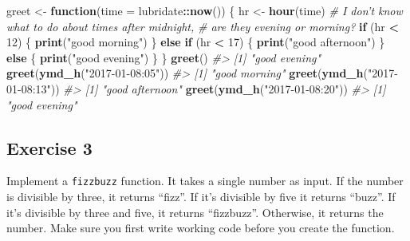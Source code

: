 \documentclass[]{book}
\newenvironment{Shaded}{\begin{snugshade}}{\end{snugshade}}
\newcommand{\CommentTok}[1]{\textcolor[rgb]{0.56,0.35,0.01}{\textit{#1}}}
\newcommand{\ControlFlowTok}[1]{\textcolor[rgb]{0.13,0.29,0.53}{\textbf{#1}}}
\newcommand{\DataTypeTok}[1]{\textcolor[rgb]{0.13,0.29,0.53}{#1}}
\newcommand{\DecValTok}[1]{\textcolor[rgb]{0.00,0.00,0.81}{#1}}
\newcommand{\KeywordTok}[1]{\textcolor[rgb]{0.13,0.29,0.53}{\textbf{#1}}}
\newcommand{\NormalTok}[1]{#1}
\newcommand{\OperatorTok}[1]{\textcolor[rgb]{0.81,0.36,0.00}{\textbf{#1}}}
\newcommand{\StringTok}[1]{\textcolor[rgb]{0.31,0.60,0.02}{#1}}
\theoremstyle{plain}
\theoremstyle{remark}
\theoremstyle{definition}
\theoremstyle{definition}
\theoremstyle{definition}
\theoremstyle{remark}
\begin{document}
\begin{Shaded}
\begin{Highlighting}[]
\NormalTok{greet <-}\StringTok{ }\ControlFlowTok{function}\NormalTok{(}\DataTypeTok{time =}\NormalTok{ lubridate}\OperatorTok{::}\KeywordTok{now}\NormalTok{()) \{}
\NormalTok{  hr <-}\StringTok{ }\KeywordTok{hour}\NormalTok{(time)}
  \CommentTok{# I don't know what to do about times after midnight,}
  \CommentTok{# are they evening or morning?}
  \ControlFlowTok{if}\NormalTok{ (hr }\OperatorTok{<}\StringTok{ }\DecValTok{12}\NormalTok{) \{}
    \KeywordTok{print}\NormalTok{(}\StringTok{"good morning"}\NormalTok{)}
\NormalTok{  \} }\ControlFlowTok{else} \ControlFlowTok{if}\NormalTok{ (hr }\OperatorTok{<}\StringTok{ }\DecValTok{17}\NormalTok{) \{}
    \KeywordTok{print}\NormalTok{(}\StringTok{"good afternoon"}\NormalTok{)}
\NormalTok{  \} }\ControlFlowTok{else}\NormalTok{ \{}
    \KeywordTok{print}\NormalTok{(}\StringTok{"good evening"}\NormalTok{)}
\NormalTok{  \}}
\NormalTok{\}}
\KeywordTok{greet}\NormalTok{()}
\CommentTok{#> [1] "good evening"}
\KeywordTok{greet}\NormalTok{(}\KeywordTok{ymd_h}\NormalTok{(}\StringTok{"2017-01-08:05"}\NormalTok{))}
\CommentTok{#> [1] "good morning"}
\KeywordTok{greet}\NormalTok{(}\KeywordTok{ymd_h}\NormalTok{(}\StringTok{"2017-01-08:13"}\NormalTok{))}
\CommentTok{#> [1] "good afternoon"}
\KeywordTok{greet}\NormalTok{(}\KeywordTok{ymd_h}\NormalTok{(}\StringTok{"2017-01-08:20"}\NormalTok{))}
\CommentTok{#> [1] "good evening"}
\end{Highlighting}
\end{Shaded}

\hypertarget{exercise-3-39}{%
\subsection{Exercise 3}\label{exercise-3-39}}

Implement a \texttt{fizzbuzz} function. It takes a single number as
input. If the number is divisible by three, it returns ``fizz''. If it's
divisible by five it returns ``buzz''. If it's divisible by three and
five, it returns ``fizzbuzz''. Otherwise, it returns the number. Make
sure you first write working code before you create the function.
\end{document}
